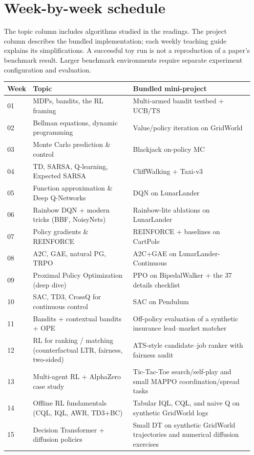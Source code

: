 \documentclass[11pt,oneside]{scrbook}
\begin{document}
\section{Week-by-week schedule}
The topic column includes algorithms studied in the readings. The project
column describes the bundled implementation; each weekly teaching guide
explains its simplifications. A successful toy run is not a reproduction of a
paper's benchmark result. Larger benchmark environments require separate
experiment configuration and evaluation.
\begin{longtable}{@{}p{1.4cm}p{6.4cm}p{6.0cm}@{}}
\toprule
\textbf{Week} & \textbf{Topic} & \textbf{Bundled mini-project} \\
\midrule
\endhead
01 & MDPs, bandits, the RL framing & Multi-armed bandit testbed + UCB/TS \\
02 & Bellman equations, dynamic programming & Value/policy iteration on GridWorld \\
03 & Monte Carlo prediction \& control & Blackjack on-policy MC \\
04 & TD, SARSA, Q-learning, Expected SARSA & CliffWalking + Taxi-v3 \\
05 & Function approximation \& Deep Q-Networks & DQN on LunarLander \\
06 & Rainbow DQN + modern tricks (BBF, NoisyNets) & Rainbow-lite ablations on LunarLander \\
07 & Policy gradients \& REINFORCE & REINFORCE + baselines on CartPole \\
08 & A2C, GAE, natural PG, TRPO & A2C+GAE on LunarLander-Continuous \\
09 & Proximal Policy Optimization (deep dive) & PPO on BipedalWalker + the 37 details checklist \\
10 & SAC, TD3, CrossQ for continuous control & SAC on Pendulum \\
11 & Bandits + contextual bandits + OPE & Off-policy evaluation of a synthetic insurance lead--market matcher \\
12 & RL for ranking / matching (counterfactual LTR, fairness, two-sided) & ATS-style candidate--job ranker with fairness audit \\
13 & Multi-agent RL + AlphaZero case study & Tic-Tac-Toe search/self-play and small MAPPO coordination/spread tasks \\
14 & Offline RL fundamentals (CQL, IQL, AWR, TD3+BC) & Tabular IQL, CQL, and naive Q on synthetic GridWorld logs \\
15 & Decision Transformer + diffusion policies & Small DT on synthetic GridWorld trajectories and numerical diffusion exercises \\

\end{longtable}
\end{document}
